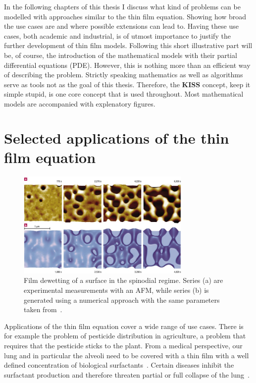 In the following chapters of this thesis I discuss what kind of problems can be modelled with approaches similar to the thin film equation.
Showing how broad the use cases are and where possible extensions can lead to.
Having these use cases, both academic and industrial, is of utmost importance to justify the further development of thin film models. 
Following this short illustrative part will be, of course, the introduction of the mathematical models with their partial differential equations (PDE). 
However, this is nothing more than an efficient way of describing the problem.
Strictly speaking mathematics as well as algorithms serve as tools not as the goal of this thesis. 
Therefore, the \textbf{KISS} concept, keep it simple stupid, is one core concept that is used throughout.
Most mathematical models are accompanied with explenatory figures.        

\section{Selected applications of the thin film equation}
\label{section:applications}
\begin{figure}
    \centering
    \includegraphics[width=0.75\textwidth]{graphics/41563_2003_Article_BFnmat788_Fig1_HTML.png}
    \caption{Film dewetting of a surface in the spinodial regime.
    Series (a) are experimental measurements with an AFM, while series (b) is generated using a numerical approach with the same parameters taken from~\cite{beckerComplexDewettingScenarios2003}.}
    \label{fig:becker_dewetting}
\end{figure}
Applications of the thin film equation cover a wide range of use cases. 
There is for example the problem of pesticide distribution in agriculture, a problem that requires that the pesticide sticks to the plant.
From a medical perspective, our lung and in particular the alveoli need to be covered with a thin film with a well defined concentration of biological surfactants~\cite{hermansLungSurfactantsDifferent2015}.
Certain diseases inhibit the surfactant production and therefore threaten partial or full collapse of the lung~\cite{doi:10.1146/annurev.fl.26.010194.002525}.

